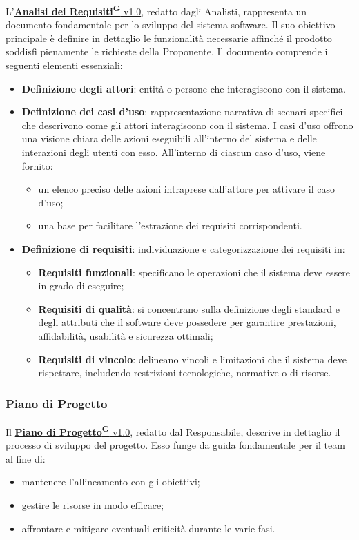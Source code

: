 L'\href{https://code7crusaders.github.io/docs/PB/documentazione_interna/glossario.html#analisi-dei-requisiti}{\textbf{Analisi dei Requisiti\textsuperscript{G}} v1.0}, redatto dagli Analisti, rappresenta un documento fondamentale per lo sviluppo del sistema software. Il suo obiettivo principale è definire in dettaglio le funzionalità necessarie affinché il prodotto soddisfi pienamente le richieste della Proponente.
Il documento comprende i seguenti elementi essenziali:
\begin{itemize}
    \item \textbf{Definizione degli attori}: entità o persone che interagiscono con il sistema.
    \item \textbf{Definizione dei casi d’uso}: rappresentazione narrativa di scenari specifici che descrivono come gli attori interagiscono con il sistema. I casi d’uso offrono una visione chiara delle azioni eseguibili all’interno del sistema e delle interazioni degli utenti con esso. All’interno di ciascun caso d’uso, viene fornito:
    \begin{itemize}
        \item un elenco preciso delle azioni intraprese dall’attore per attivare il caso d’uso;
        \item una base per facilitare l’estrazione dei requisiti corrispondenti.
    \end{itemize}
    \item \textbf{Definizione di requisiti}: individuazione e categorizzazione dei requisiti in:
    \begin{itemize}
        \item \textbf{Requisiti funzionali}: specificano le operazioni che il sistema deve essere in grado di eseguire;
        \item \textbf{Requisiti di qualità}: si concentrano sulla definizione degli standard e degli attributi che il software deve possedere per garantire prestazioni, affidabilità, usabilità e sicurezza ottimali;
        \item \textbf{Requisiti di vincolo}: delineano vincoli e limitazioni che il sistema deve rispettare, includendo restrizioni tecnologiche, normative o di risorse.
    \end{itemize}
\end{itemize}

\subsubsection{Piano di Progetto}
Il \href{https://code7crusaders.github.io/docs/PB/documentazione_interna/glossario.html#piano-di-progetto}{\textbf{Piano di Progetto\textsuperscript{G}} v1.0}, redatto dal Responsabile, descrive in dettaglio il processo di sviluppo del progetto. Esso funge da guida fondamentale per il team al fine di:
\begin{itemize}
    \item mantenere l’allineamento con gli obiettivi;
    \item gestire le risorse in modo efficace;
    \item affrontare e mitigare eventuali criticità durante le varie fasi.
\end{itemize}

